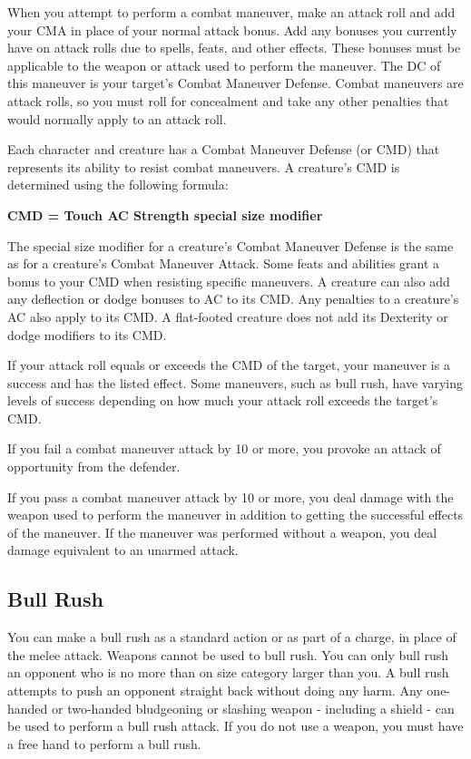 When you attempt to perform a combat maneuver, make an attack roll and add your CMA in place of your normal attack bonus. Add any bonuses you currently have on attack rolls due to spells, feats, and other effects. These bonuses must be applicable to the weapon or attack used to perform the maneuver. The DC of this maneuver is your target's Combat Maneuver Defense. Combat maneuvers are attack rolls, so you must roll for concealment and take any other penalties that would normally apply to an attack roll.

 Each character and creature has a Combat Maneuver Defense (or CMD) that represents its ability to resist combat maneuvers. A creature's CMD is determined using the following formula:

\textbf{\centering CMD = Touch AC \add Strength \add special size modifier}

The special size modifier for a creature's Combat Maneuver Defense is the same as for a creature's Combat Maneuver Attack. Some feats and abilities grant a bonus to your CMD when resisting specific maneuvers. A creature can also add any deflection or dodge bonuses to AC to its CMD. Any penalties to a creature's AC also apply to its CMD. A flat-footed creature does not add its Dexterity or dodge modifiers to its CMD.

 If your attack roll equals or exceeds the CMD of the target, your maneuver is a success and has the listed effect. Some maneuvers, such as bull rush, have varying levels of success depending on how much your attack roll exceeds the target's CMD.

If you fail a combat maneuver attack by 10 or more, you provoke an attack of opportunity from the defender.

If you pass a combat maneuver attack by 10 or more, you deal damage with the weapon used to perform the maneuver in addition to getting the successful effects of the maneuver. If the maneuver was performed without a weapon, you deal damage equivalent to an unarmed attack.

\subsection{Bull Rush}
You can make a bull rush as a standard action or as part of a charge, in place of the melee attack. Weapons cannot be used to bull rush. You can only bull rush an opponent who is no more than on size category larger than you. A bull rush attempts to push an opponent straight back without doing any harm. Any one-handed or two-handed bludgeoning or slashing weapon - including a shield - can be used to perform a bull rush attack. If you do not use a weapon, you must have a free hand to perform a bull rush.

